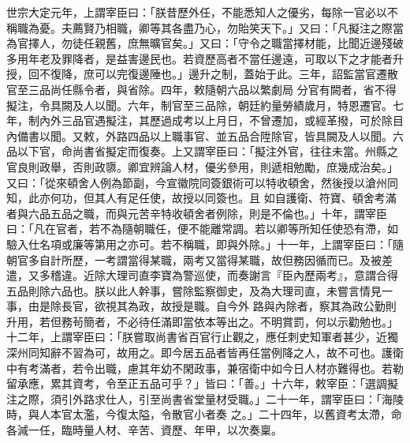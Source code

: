 \begin{pinyinscope}
 世宗大定元年，上謂宰臣曰：「朕昔歷外任，不能悉知人之優劣，每除一官必以不稱職為憂。夫薦賢乃相職，卿等其各盡乃心，勿貽笑天下。」又曰：「凡擬注之際當為官擇人，勿徒任親舊，庶無曠官矣。」又曰：「守令之職當擇材能，比聞近邊殘破多用年老及罪降者，是益害邊民也。若資歷高者不當任邊遠，可取以下之才能者升授，回不復降，庶可以完復邊陲也。」邊升之制，蓋始于此。三年，詔監當官遷散官至三品尚任縣令者，與省除。四年，敕隨朝六品以繁劇局
 分官有闕者，省不得擬注，令具闕及人以聞。六年，制官至三品除，朝廷約量勞績歲月，特恩遷官。七年，制內外三品官遇擬注，其歷過成考以上月日，不曾遷加，或經革撥，可於除目內備書以聞。又敕，外路四品以上職事官、並五品合陞除官，皆具闕及人以聞。六品以下官，命尚書省擬定而復奏。上又謂宰臣曰：「擬注外官，往往未當。州縣之官良則政舉，否則政隳。卿宜辨論人材，優劣參用，則遞相勉勵，庶幾成治矣。」又曰：「從來頓舍人例為節副，今宣徽院同簽銀術可以特收頓舍，然後授以滄州同知，此亦何功，但其人有足任使，故授以同簽也。且
 如自護衛、符寶、頓舍考滿者與六品五品之職，而與元苦辛特收頓舍者例除，則是不倫也。」十年，謂宰臣曰：「凡在官者，若不為隨朝職任，便不能離常調。若以卿等所知任使恐有滯，如驗入仕名項或廉等第用之亦可。若不稱職，即與外除。」十一年，上謂宰臣曰：「隨朝官多自計所歷，一考謂當得某職，兩考又當得某職，故但務因循而已。及被差遣，又多稽違。近除大理司直李寶為警巡使，而奏謝言『臣內歷兩考』，意謂合得五品則除六品也。朕以此人幹事，嘗除監察御史，及為大理司直，未嘗言情見一事，由是除長官，欲視其為政，故授是職。自今外
 路與內除者，察其為政公勤則升用，若但務茍簡者，不必待任滿即當依本等出之。不明賞罰，何以示勸勉也。」十二年，上謂宰臣曰：「朕嘗取尚書省百官行止觀之，應任刺史知軍者甚少，近獨深州同知辭不習為可，故用之。即今居五品者皆再任當例降之人，故不可也。護衛中有考滿者，若令出職，慮其年幼不閑政事，兼宿衛中如今日人材亦難得也。若勒留承應，累其資考，令至正五品可乎？」皆曰：「善。」十六年，敕宰臣：「選調擬注之際，須引外路求仕人，引至尚書省堂量材受職。」二十一年，謂宰臣曰：「海陵時，與人本官太濫，今復太隘，令散官小者奏
 之。」二十四年，以舊資考太滯，命各減一任，臨時量人材、辛苦、資歷、年甲，以次奏稟。




\end{pinyinscope}
